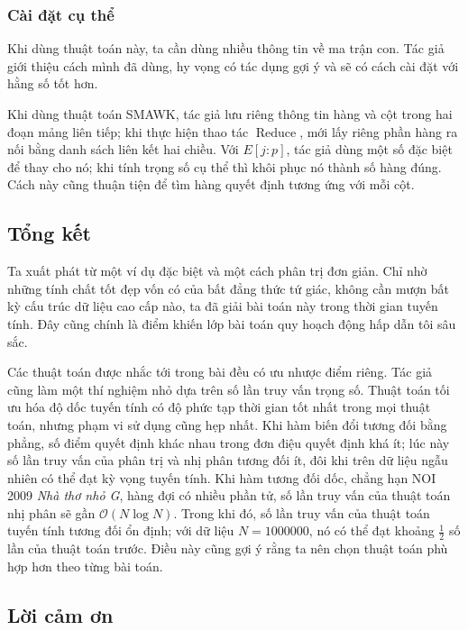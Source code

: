 \documentclass[11pt]{article}
\newcommand{\Oh}{\mathcal{O}}
\begin{document}
\subsubsection{Cài đặt cụ thể}

Khi dùng thuật toán này, ta cần dùng nhiều thông tin về ma trận con. Tác giả
giới thiệu cách mình đã dùng, hy vọng có tác dụng gợi ý và sẽ có cách cài đặt
với hằng số tốt hơn.

Khi dùng thuật toán SMAWK, tác giả lưu riêng thông tin hàng và cột trong hai
đoạn mảng liên tiếp; khi thực hiện thao tác \(\operatorname{Reduce}\), mới lấy
riêng phần hàng ra nối bằng danh sách liên kết hai chiều. Với \(E[j:p]\), tác
giả dùng một số đặc biệt để thay cho nó; khi tính trọng số cụ thể thì khôi
phục nó thành số hàng đúng. Cách này cũng thuận tiện để tìm hàng quyết định
tương ứng với mỗi cột.

\subsection{Tổng kết}

Ta xuất phát từ một ví dụ đặc biệt và một cách phân trị đơn giản. Chỉ nhờ
những tính chất tốt đẹp vốn có của bất đẳng thức tứ giác, không cần mượn bất
kỳ cấu trúc dữ liệu cao cấp nào, ta đã giải bài toán này trong thời gian tuyến
tính. Đây cũng chính là điểm khiến lớp bài toán quy hoạch động hấp dẫn tôi
sâu sắc.

Các thuật toán được nhắc tới trong bài đều có ưu nhược điểm riêng. Tác giả
cũng làm một thí nghiệm nhỏ dựa trên số lần truy vấn trọng số. Thuật toán tối
ưu hóa độ dốc tuyến tính có độ phức tạp thời gian tốt nhất trong mọi thuật
toán, nhưng phạm vi sử dụng cũng hẹp nhất. Khi hàm biến đổi tương đối bằng
phẳng, số điểm quyết định khác nhau trong đơn điệu quyết định khá ít; lúc này
số lần truy vấn của phân trị và nhị phân tương đối ít, đôi khi trên dữ liệu
ngẫu nhiên có thể đạt kỳ vọng tuyến tính. Khi hàm tương đối dốc, chẳng hạn
NOI 2009 \emph{Nhà thơ nhỏ G}, hàng đợi có nhiều phần tử, số lần truy vấn của
thuật toán nhị phân sẽ gần \(\Oh(N\log N)\). Trong khi đó, số lần truy vấn của
thuật toán tuyến tính tương đối ổn định; với dữ liệu \(N=1000000\), nó có thể
đạt khoảng \(\frac12\) số lần của thuật toán trước. Điều này cũng gợi ý rằng
ta nên chọn thuật toán phù hợp hơn theo từng bài toán.

\subsection{Lời cảm ơn}
\end{document}
